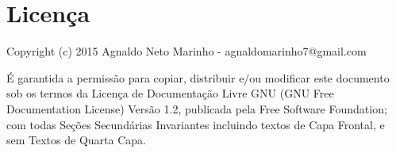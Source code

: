 \newpage \chapter{Licença}\setcounter{SteP}{1}

\begin{BoxVerbatim}
    Copyright (c)  2015  Agnaldo Neto Marinho - agnaldomarinho7@gmail.com

    É garantida a permissão para copiar, distribuir e/ou modificar este documento
sob os termos da Licença de Documentação Livre GNU (GNU Free Documentation
License) Versão 1.2, publicada pela Free Software Foundation; com todas Seções
Secundárias Invariantes incluindo textos de Capa Frontal, e sem Textos de Quarta
Capa.
\end{BoxVerbatim}

